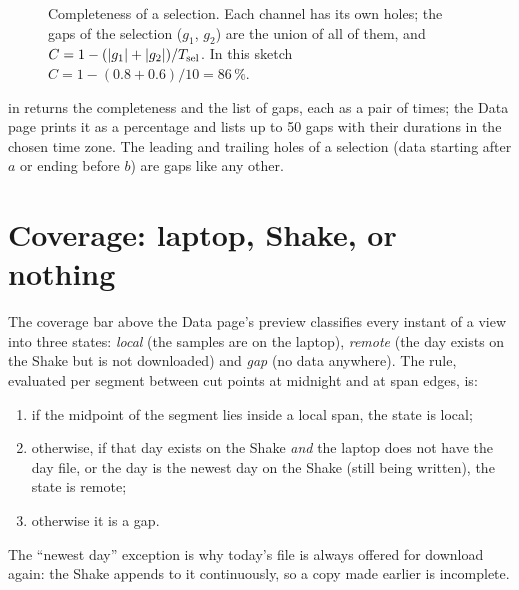 \begin{figure}[tbp]
\centering
{}
\caption{Completeness of a selection. Each channel has its own holes; the gaps of the selection ($g_1$, $g_2$) are the
union of all of them, and $C=1-(|g_1|+|g_2|)/T_{\mathrm{sel}}$. In this sketch $C = 1-(0.8+0.6)/10 = 86\,\%$.}\label{fig:gaps}
\end{figure}

\begin{rs3dapp}
 in  returns the completeness and the list of gaps, each as a
pair of times; the Data page prints it as a percentage and lists up to 50 gaps with their durations in the chosen
time zone. The leading and trailing holes of a selection (data starting after $a$ or ending before $b$) are gaps like
any other.
\end{rs3dapp}

\section{Coverage: laptop, Shake, or nothing}
The coverage bar above the Data page's preview classifies every instant of a view into three states:
\emph{local} (the samples are on the laptop), \emph{remote} (the day exists on the Shake but is not downloaded) and
\emph{gap} (no data anywhere). The rule, evaluated per segment between cut points at midnight and at span edges, is:
\begin{enumerate}
\item if the midpoint of the segment lies inside a local span, the state is local;
\item otherwise, if that day exists on the Shake \emph{and} the laptop does not have the day file, or the day is the newest day
  on the Shake (still being written), the state is remote;
\item otherwise it is a gap.
\end{enumerate}
The ``newest day'' exception is why today's file is always offered for download again: the Shake appends to it
continuously, so a copy made earlier is incomplete.

